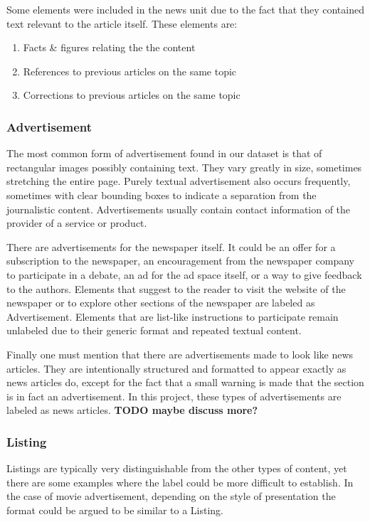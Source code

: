 \documentclass[english, bibtex]{kththesis}
\begin{document}
Some elements were included in the news unit due to the fact that they contained text relevant to the article itself. These elements are:

\begin{enumerate}
\item Facts \& figures relating the the content
\item References to previous articles on the same topic
\item Corrections to previous articles on the same topic
\end{enumerate}

\subsubsection{Advertisement}

The most common form of advertisement found in our dataset is that of rectangular images possibly containing text. They vary greatly in size, sometimes stretching the entire page. Purely textual advertisement also occurs frequently, sometimes with clear bounding boxes to indicate a separation from the journalistic content. Advertisements usually contain contact information of the provider of a service or product. 

There are advertisements for the newspaper itself. It could be an offer for a subscription to the newspaper, an encouragement from the newspaper company to participate in a debate, an ad for the ad space itself, or a way to give feedback to the authors. Elements that suggest to the reader to visit the website of the newspaper or to explore other sections of the newspaper are labeled as Advertisement. Elements that are list-like instructions to participate remain unlabeled due to their generic format and repeated textual content.

Finally one must mention that there are advertisements made to look like news articles. They are intentionally structured and formatted to appear exactly as news articles do, except for the fact that a small warning is made that the section is in fact an advertisement. In this project, these types of advertisements are labeled as news articles. \textbf{TODO maybe discuss more?}

\subsubsection{Listing}

Listings are typically very distinguishable from the other types of content, yet there are some examples where the label could be more difficult to establish. In the case of movie advertisement, depending on the style of presentation the format could be argued to be similar to a Listing.
\end{document}
